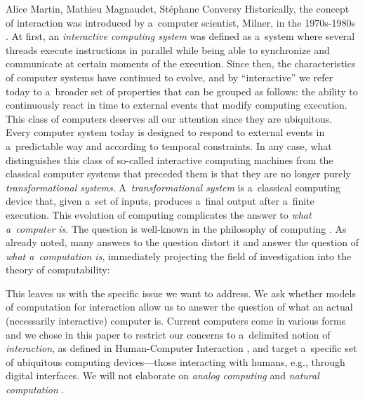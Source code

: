 \begin{artengenv2auth}{Alice Martin, Mathieu Magnaudet, Stéphane Conversy}
Historically, the concept of interaction was introduced by a~computer scientist, Milner, in the 1970s-1980s \parencite{Milner1975, Milner1982, Milner1993, Milner1999}. At first, an \emph{interactive computing system} was defined as a~system where several threads execute instructions in parallel while being able to synchronize and communicate at certain moments of the execution. Since then, the characteristics of computer systems have continued to evolve, and by ``interactive'' we refer today to a~broader set of properties that can be grouped as follows: the ability to continuously react in time to external events that modify computing execution. 
This class of computers deserves all our attention since they are ubiquitous. Every computer system today is designed to respond to external events in a~predictable way and according to temporal constraints. In any case, what distinguishes this class of so-called interactive computing machines from the classical computer systems that preceded them is that they are no longer purely \emph{transformational systems}. A~\emph{transformational system} is a~classical computing device that, given a~set of inputs, produces a~final output after a~finite execution. 
This evolution of computing complicates the answer to \textit{what a~computer is}. The question is well-known in the philosophy of computing \parencite{Piccinini2008, Rapaport2018, Smith2002}. As already noted, many answers to the question distort it and answer the question of \textit{what a~computation is}, immediately projecting the field of investigation into the theory of computability: 



This leaves us with the specific issue we want to address. We ask whether models of computation for interaction allow us to answer the question of what an actual (necessarily interactive) computer is. Current computers come in various forms and we chose in this paper to restrict our concerns to a~delimited notion of \textit{interaction}, as defined in Human-Computer Interaction \parencite{Myers1994, Dearden1997, Beaudouin-Lafon2006,  Hornbaek2017, Basman2018}, and target a~specific set of ubiquitous computing devices---those interacting with humans, e.g., through digital interfaces. We will not elaborate on \textit{analog computing} \parencite{Bielecki2019} and \textit{natural computation} \parencite{Dodig-Crnkovic2011, MacLennan2003}. 


\end{artengenv2auth}
